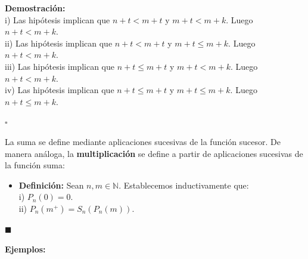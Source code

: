 \documentclass[10 pt]{article}
\begin{document}
\Large{\textbf{Demostración:} \\

i) Las hipótesis implican que $n+t<m+t$ y $m+t<m+k$. Luego $n+t<m+k$.  \\

ii) Las hipótesis implican que $n+t<m+t$ y $m+t \leq m+k$. Luego $n+t<m+k$. \\

iii) Las hipótesis implican que $n+t \leq m+t$ y $m+t<m+k$. Luego $n+t<m+k$. \\

iv) Las hipótesis implican que $n+t \leq m+t$ y $m+t \leq m+k$. Luego $n+t \leq m+k$.} \\

\begin{flushright}
    $\square$
\end{flushright}

\Large{La suma se define mediante aplicaciones sucesivas de la función sucesor. De manera análoga, la \textbf{multiplicación} se define a partir de aplicaciones sucesivas de la función suma:} \\

\begin{itemize}
    \item \Large{\textbf{Definición:} Sean $n,m \in \mathbb N$. Establecemos inductivamente que: \\

    i) $P_n(0)=0$. \\

    ii) $P_n(m^+)=S_n(P_n(m))$.} \\
\end{itemize}

\begin{flushright}
    $\blacksquare$
\end{flushright}

\Large{\textbf{Ejemplos:}} \\
\end{document}
